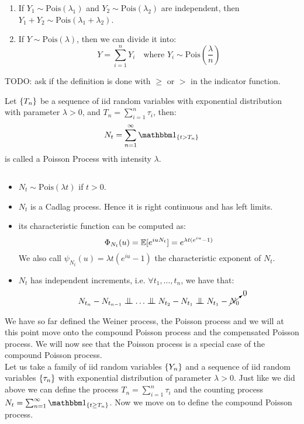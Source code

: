\begin{remark}
    $ $ \newline %
    \begin{enumerate}
        \item If $Y_1 \sim \text{Pois}(\lambda_1)$ and $Y_2 \sim
            \text{Pois}(\lambda_2)$ are independent, then $Y_1 + Y_2 \sim
            \text{Pois}(\lambda_1 + \lambda_2)$.
        \item If $Y \sim \text{Pois}(\lambda)$, then we can divide it into:
            \[ 
                Y = \sum^n_{i=1} Y_i \quad \text{where } Y_i \sim \text{Pois}
                \left( \frac{\lambda}{n} \right)
            \]
    \end{enumerate}
\end{remark}

TODO: ask if the definition is done with $\geq$ or $>$ in the indicator function.
\begin{definition}
Let $\{ T_n \}$ be a sequence of iid random variables with exponential distribution
with parameter $\lambda > 0$, and $T_n = \sum^n_{i=1} \tau_i$, then:
\[ N_t = \sum^\infty_{n=1} \I_{\{t > T_n\}} \]
is called a Poisson Process with intensity $\lambda$.
\end{definition}

\begin{properties}
    $ $ \newline %
    \begin{itemize}
        \item $N_t\sim\text{Pois}(\lambda t)$ if $t>0$.
        \item $N_t$ is a Cadlag process. Hence it is right continuous and has
            left limits.
        \item its characteristic function can be computed as:
            \[
                \Phi_{N_t}(u) = \mathbb{E}[e^{iuN_t}] = e^{\lambda t(e^{iu}-1)}
            \]
            We also call $\psi_{N_t}(u) = \lambda t(e^{iu}-1)$ the characteristic
            exponent of $N_t$.
        \item $N_t$ has independent increments, i.e. $\forall t_1,\ldots,t_n$,
            we have that:
            \[ N_{t_n} - N_{t_{n-1}} \indep \ldots \indep N_{t_2} - N_{t_1} \indep
                N_{t_1} - \cancelto{0}{N_0}
            \]
    \end{itemize}
\end{properties}

We have so far defined the Weiner process, the Poisson process and we will at
this point move onto the compound Poisson process and the compensated Poisson
process. We will now see that the Poisson process is a special case of the
compound Poisson process. \\
Let us take a family of iid random variables $\{ Y_n \}$ and a sequence of iid
random variables $\{ \tau_n \}$ with exponential distribution of parameter 
$\lambda > 0$. Just like we did above we can define the process $T_n = 
\sum^n_{i=1} \tau_i$ and the counting process $N_t = \sum^\infty_{n=1}
\I_{\{t\geq T_n\}}$. Now we move on to define the compound Poisson process.

